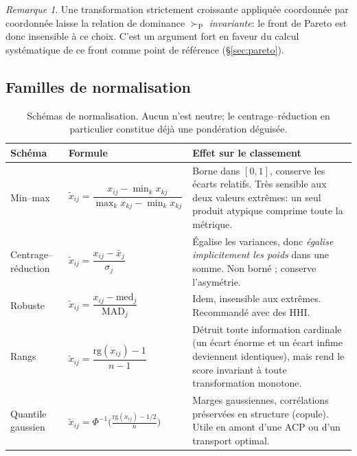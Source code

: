\documentclass[11pt,a4paper]{article}
\theoremstyle{definition}
\theoremstyle{remark}
\newtheorem{remarque}{Remarque}[section]
\newcommand{\pareto}{\succ_{\mathrm{P}}}
\begin{document}
\medskip

\begin{remarque}
  Une transformation strictement croissante appliquée coordonnée par coordonnée laisse la relation
  de dominance $\pareto$ \emph{invariante}: le front de Pareto est donc insensible à ce choix.
  C'est un argument fort en faveur du calcul systématique de ce front comme point de référence
  (§\ref{sec:pareto}).
\end{remarque}

\bigskip

\subsection{Familles de normalisation}

\medskip

\begin{table}[htbp]
  \centering
  \small
  \renewcommand{\arraystretch}{1.4}
  \begin{tabularx}{\textwidth}{@{}l l X@{}}
    \toprule
    \textbf{Schéma} & \textbf{Formule} & \textbf{Effet sur le classement} \\
    \midrule
    Min--max &
    $\tilde{x}_{ij} = \dfrac{x_{ij}-\min_k x_{kj}}{\max_k x_{kj}-\min_k x_{kj}}$ &
    Borne dans $[0,1]$, conserve les écarts relatifs. Très sensible aux deux valeurs extrêmes:
    un seul produit atypique comprime toute la métrique. \\
    Centrage--réduction &
    $\tilde{x}_{ij} = \dfrac{x_{ij}-\bar{x}_j}{\sigma_j}$ &
    Égalise les variances, donc \emph{égalise implicitement les poids} dans une somme. Non borné ;
    conserve l'asymétrie. \\
    Robuste &
    $\tilde{x}_{ij} = \dfrac{x_{ij}-\mathrm{med}_j}{\mathrm{MAD}_j}$ &
    Idem, insensible aux extrêmes. Recommandé avec des HHI. \\
    Rangs &
    $\tilde{x}_{ij} = \dfrac{\mathrm{rg}(x_{ij})-1}{n-1}$ &
    Détruit toute information cardinale (un écart énorme et un écart infime deviennent identiques),
    mais rend le score invariant à toute transformation monotone. \\
    Quantile gaussien &
    $\tilde{x}_{ij} = \Phi^{-1}\!\big(\tfrac{\mathrm{rg}(x_{ij})-1/2}{n}\big)$ &
    Marges gaussiennes, corrélations préservées en structure (copule). Utile en amont d'une ACP ou
    d'un transport optimal. \\
    \bottomrule
  \end{tabularx}
  \caption{Schémas de normalisation. Aucun n'est neutre; le centrage--réduction en particulier
  constitue déjà une pondération déguisée.}
  \label{tab:normalisation}
\end{table}
\end{document}
